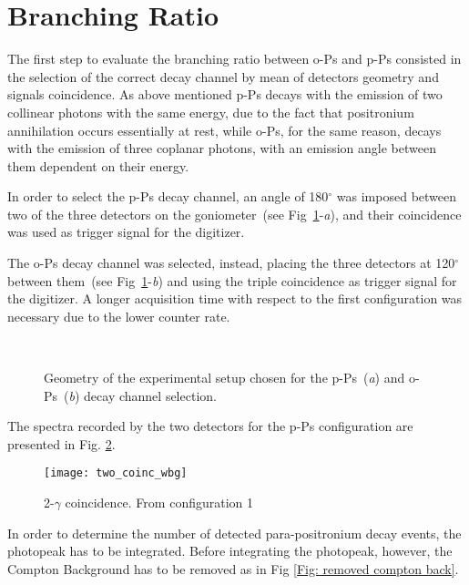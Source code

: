 \section*{Branching Ratio}

The first step to evaluate the branching ratio between o-Ps and p-Ps consisted in the selection of the correct decay channel by mean of detectors geometry and signals coincidence.
As above mentioned p-Ps decays with the emission of two collinear photons with the same energy, due to the fact that positronium annihilation occurs essentially at rest, while o-Ps, for the same reason, decays with the emission of three coplanar photons, with an emission angle between them dependent on their energy.

In order to select the p-Ps decay channel, an angle of 180$^\circ$ was imposed between two of the three detectors on the goniometer~(see Fig~\ref{Fig:PsGeometry}-\emph{a}), and their coincidence was used as trigger signal for the digitizer. 

The o-Ps decay channel was selected, instead, placing the three detectors at 120$^\circ$ between them~(see Fig~\ref{Fig:PsGeometry}-\emph{b}) and using the triple coincidence as trigger signal for the digitizer. A longer acquisition time with respect to the first configuration was necessary due to the lower counter rate.

 
\begin{figure}[h!]
	\centering
	 \quad
		 \\
	\caption{Geometry of the experimental setup chosen for the p-Ps~(\emph{a}) and o-Ps~(\emph{b}) decay channel selection.}
	\label{Fig:PsGeometry}
\end{figure}

The spectra recorded by the two detectors for the p-Ps configuration are presented in Fig. \ref{Fig:pPs_spectra_bkg}.
\begin{figure}[H]
\centering
\texttt{[image: two\_coinc\_wbg]}
\caption{2-$\gamma$ coincidence. From configuration 1}
\label{Fig:pPs_spectra_bkg}
\end{figure}

In order to determine the number of detected para-positronium decay events, the photopeak has to be integrated.
Before integrating the photopeak, however, the Compton Background has to be removed as in Fig \ref{Fig: removed compton back}.

